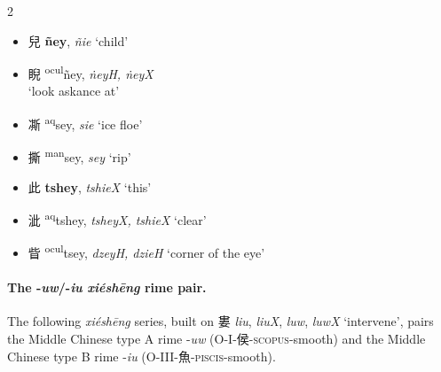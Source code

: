 \begin{multicols}{2}
\raggedcolumns
\begin{itemize}
    \item {\Large{兒}} %
    {\large{\textbf{ñey}}},
    \textit{ñie} `child'        %
    
    \item {\Large{睨}} %
    {\large{{\textsuperscript{ocul}}ñey}},
    \textit{ṅeyH, ṅeyX} \\ `look askance at'        %
\end{itemize}

\medskip

\begin{minipage}{\columnwidth}
\begin{itemize}[leftmargin=*, labelsep=0.5em]

    \item {\Large{凘}} %
    {\large{{\textsuperscript{aq}}sey}},
    \textit{sie} `ice floe'        %

    \item {\Large{撕}} %
    {\large{{\textsuperscript{man}}sey}},
    \textit{sey} `rip'        %
\end{itemize}
\end{minipage}

\medskip

\begin{minipage}{\columnwidth}
\begin{itemize}[leftmargin=*, labelsep=0.5em]
    \item {\Large{此}} %
    {\large{\textbf{tshey}}},
    \textit{tshieX} `this'        %

    \item {\Large{泚}} %
    {\large{{\textsuperscript{aq}}tshey}},
    \textit{tsheyX, tshieX} `clear'        %

    \item {\Large{眥}} %
    {\large{{\textsuperscript{ocul}}tsey}},
    \textit{dzeyH, dzieH} `corner of the eye'        %
\end{itemize}
\end{minipage}
\end{multicols}


\paragraph{The -\textit{uw}/-\textit{iu} \textit{xiéshēng} rime pair.}
\label{par:uw-iu-XS-pair}
The following \textit{xiéshēng} series, built on 婁
    \textit{liu}, \textit{liuX}, \textit{luw}, \textit{luwX} `intervene', pairs the Middle Chinese type A rime -\textit{uw} (O-I-侯-\textsc{scopus}-smooth) and the Middle Chinese type B rime -\textit{iu} 
(O-III-魚-\textsc{piscis}-smooth). 


